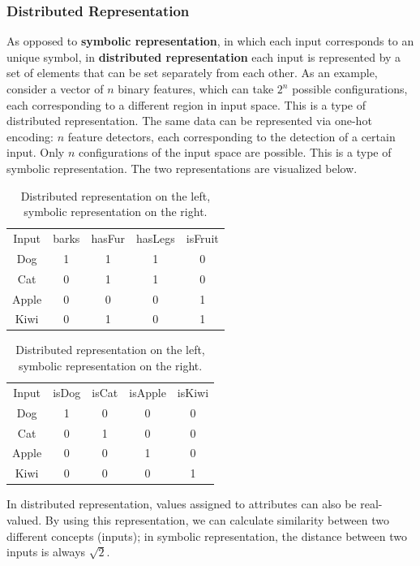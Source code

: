 \subsubsection{Distributed Representation}

As opposed to \textbf{symbolic representation}, in which each input corresponds to an unique symbol, in \textbf{distributed representation} each input is represented by a set of elements that can be set separately from each other. As an example, consider a vector of $n$ binary features, which can take $2^n$ possible configurations, each corresponding to a different region in input space. This is a type of distributed representation. The same data can be represented via one-hot encoding: $n$ feature detectors, each corresponding to the detection of a certain input. Only $n$ configurations of the input space are possible. This is a type of symbolic representation. The two representations are visualized below.

\begin{table}[h]
    \centering
    \begin{tabular}{|c|cccc|}
        \hline
        \rowcolor{gray}
        Input & barks & hasFur & hasLegs & isFruit \\
        Dog & 1 & 1 & 1 & 0 \\
        Cat & 0 & 1 & 1 & 0\\
        Apple & 0 & 0 & 0 & 1\\
        Kiwi & 0 & 1 & 0 & 1\\
        \hline
    \end{tabular} 
\quad
    \begin{tabular}{|c|cccc|}
        \hline
        \rowcolor{gray}
        Input & isDog & isCat & isApple & isKiwi \\
        Dog & 1 & 0 & 0 & 0 \\
        Cat & 0 & 1 & 0 & 0 \\
        Apple & 0 & 0 & 1 & 0 \\
        Kiwi & 0 & 0 & 0 & 1 \\
        \hline
    \end{tabular}
    \caption{Distributed representation on the left, symbolic representation on the right.}
\end{table}

In distributed representation, values assigned to attributes can also be real-valued. By using this representation, we can calculate similarity between two different concepts (inputs); in symbolic representation, the distance between two inputs is always $\sqrt{2}$.

